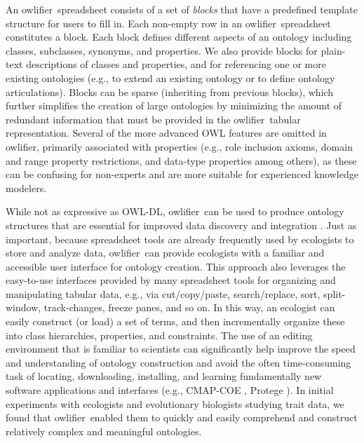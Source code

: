 \documentclass[5p,authoryear]{elsarticle}
\newcommand{\owlifier}{\textsf{owlifier}}
\begin{document}
An \owlifier\ spreadsheet consists of a set of \emph{blocks} that have
a predefined template structure for users to fill in. Each non-empty
row in an \owlifier\ spreadsheet constitutes a block. Each block
defines different aspects of an ontology including classes,
subclasses, synonyms, and properties.  We also provide blocks for
plain-text descriptions of classes and properties, and for referencing
one or more existing ontologies (e.g., to extend an existing ontology
or to define ontology articulations). Blocks can be sparse (inheriting
from previous blocks), which further simplifies the creation of large
ontologies by minimizing the amount of redundant information that must
be provided in the \owlifier\ tabular representation. Several of the
more advanced OWL features are omitted in \owlifier, primarily
associated with properties (e.g., role inclusion axioms, domain and
range property restrictions, and data-type properties among others),
as these can be confusing for non-experts and are more suitable for
experienced knowledge modelers.

While not as expressive as OWL-DL, \owlifier\ can be used to produce
ontology structures that are essential for improved data discovery and
integration \citep{madin07:_ontol_for_descr_and_synth}. Just as
important, because spreadsheet tools are already frequently used by
ecologists to store and analyze data, \owlifier\ can provide
ecologists with a familiar and accessible user interface for ontology
creation. This approach also leverages the easy-to-use interfaces
provided by many spreadsheet tools for organizing and manipulating
tabular data, e.g., via cut/copy/paste, search/replace, sort,
split-window, track-changes, freeze panes, and so on.  In this way, an
ecologist can easily construct (or load) a set of terms, and then
incrementally organize these into class hierarchies, properties, and
constraints.  The use of an editing environment that is familiar to
scientists can significantly help improve the speed and understanding
of ontology construction and avoid the often time-consuming task of
locating, downloading, installing, and learning fundamentally new
software applications and interfaces (e.g., CMAP-COE
\citep{hayes05:_collab_knowl_captur_in_ontol}, Protege
\citep{knublauch04:_editin_descr_logic_ontol_with}). In initial
experiments with ecologists and evolutionary biologists studying trait
data, we found that \owlifier\ enabled them to quickly and easily
comprehend and construct relatively complex and meaningful ontologies.
\end{document}
